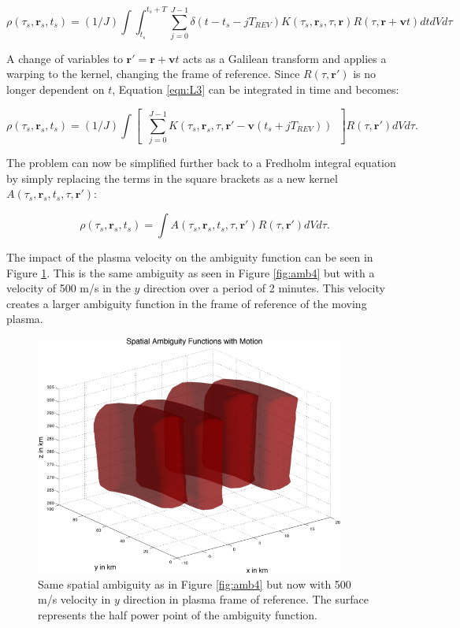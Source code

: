 \begin{equation}
\label{eqn:L3}
\rho(\tau_s,\mathbf{r}_s,t_s) =(1/J) \int \int_{t_s}^{t_s+T} \displaystyle \sum_{j=0}^{J-1}\delta(t-t_s-jT_{REV}) K(\tau_s,\mathbf{r}_s,\tau,\mathbf{r})R(\tau,\mathbf{r}+\mathbf{v}t)dtdVd\tau\end{equation}

A change of variables to $\mathbf{r}' = \mathbf{r}+\mathbf{v}t$ acts as a Galilean transform and applies a warping to the kernel, changing the frame of reference. Since $R(\tau,\mathbf{r}')$ is no longer dependent on $t$, Equation \ref{eqn:L3} can be integrated in time and becomes:

\begin{equation}
\label{eqn:L5}
\rho(\tau_s,\mathbf{r}_s,t_s)= (1/J)\int \left[ \;\;  \displaystyle \sum_{j=0}^{J-1} K(\tau_s,\mathbf{r}_s,\tau,\mathbf{r}'-\mathbf{v}(t_s+jT_{REV})) \;\; \right]R(\tau,\mathbf{r}')dVd\tau.
\end{equation}

The problem can now be simplified further back to a Fredholm integral equation by simply replacing the terms in the square brackets as a new kernel $A(\tau_s,\mathbf{r}_s,t_s,\tau,\mathbf{r}')$:

\begin{equation}
\label{eqn:L6}
\rho(\tau_s,\mathbf{r}_s,t_s)= \int A(\tau_s,\mathbf{r}_s,t_s,\tau,\mathbf{r}') R(\tau,\mathbf{r}')dVd\tau.
\end{equation}

\noindent The impact of the plasma velocity on the ambiguity function can be seen in Figure \ref{fig:ambtime}. This is the same ambiguity as seen in Figure \ref{fig:amb4} but with a velocity of 500 m/s in the $y$ direction over a period of 2 minutes. This velocity creates a larger ambiguity function in the frame of reference of the moving plasma.

\begin{figure}[!t]
	\centering
	\includegraphics[width=4in]{spaceambmoving}
	\caption{Same spatial ambiguity as in Figure \ref{fig:amb4} but now with 500 m/s velocity in $y$ direction in plasma frame of reference. The surface represents the half power point of the ambiguity function.}
	\label{fig:ambtime}
\end{figure}


